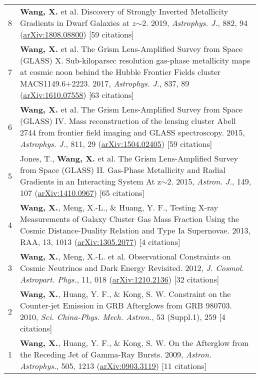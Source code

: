\documentclass[letterpaper,10pt]{article}
\begin{document}
\begin{longtable}{rp{6.3in}}
    8 &  \textbf{Wang, X.} et al. Discovery of Strongly Inverted Metallicity Gradients in Dwarf Galaxies at $z$$\sim$2. 2019, \textit{Astrophys. J.}, 882, 94 (\href{https://arxiv.org/abs/1808.08800}{arXiv:1808.08800}) [59 citations]  \\

    7 &  \textbf{Wang, X.} et al. The Grism Lens-Amplified Survey from Space (GLASS) X. Sub-kiloparsec resolution gas-phase metallicity maps at cosmic noon behind the Hubble Frontier Fields cluster MACS1149.6+2223. 2017, \textit{Astrophys. J.}, 837, 89 (\href{http://arxiv.org/abs/1610.07558} {arXiv:1610.07558}) [63 citations]    \\

    6 &  \textbf{Wang, X.} et al. The Grism Lens-Amplified Survey from Space (GLASS) IV. Mass reconstruction of the lensing cluster Abell 2744 from frontier field imaging and GLASS spectroscopy. 2015, \textit{Astrophys. J.}, 811, 29 (\href{http://arxiv.org/abs/1504.02405}{arXiv:1504.02405}) [59 citations] \\

    5 &  Jones, T., \textbf{Wang, X.} et al. The Grism Lens-Amplified Survey from Space (GLASS) II. Gas-Phase Metallicity and Radial Gradients in an Interacting System At z$\sim$2. 2015, \textit{Astron. J.}, 149, 107 (\href{http://arxiv.org/abs/1410.0967}{arXiv:1410.0967}) [65 citations] \\

    4 &  \textbf{Wang, X.}, Meng, X.-L., \& Huang, Y. F., Testing X-ray Measurements of Galaxy Cluster Gas Mass Fraction Using the Cosmic Distance-Duality Relation and Type Ia Supernovae. 2013, RAA, 13, 1013 (\href{http://arxiv.org/abs/1305.2077}{arXiv:1305.2077}) [4 citations] \\

    3 &  \textbf{Wang, X.}, Meng, X.-L. et al. Observational Constraints on Cosmic Neutrinos and Dark Energy Revisited. 2012, \textit{J. Cosmol.  Astropart. Phys.}, 11, 018 (\href{http://arxiv.org/abs/1210.2136}{arXiv:1210.2136}) [32 citations] \\

    2 &  \textbf{Wang, X.}, Huang, Y. F., \& Kong, S. W. Constraint on the Counter-jet Emission in GRB Afterglows from GRB 980703. 2010, \textit{Sci.  China-Phys. Mech. Astron.}, 53 (Suppl.1), 259 [4 citations]    \\

    1 &  \textbf{Wang, X.}, Huang, Y. F., \& Kong, S. W. On the Afterglow from the Receding Jet of Gamma-Ray Bursts. 2009, \textit{Astron. Astrophys.}, 505, 1213 (\href{http://arxiv.org/abs/0903.3119}{arXiv:0903.3119}) [11 citations]   \\


\end{longtable}
\end{document}
